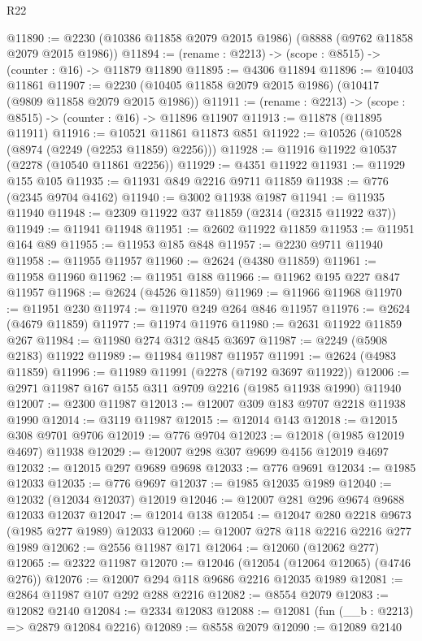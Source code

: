 \begin{lexlean}{R22}
\begin{coremodule}
@11890 := @2230 (@10386 @11858 @2079 @2015 @1986) (@8888 (@9762 @11858 @2079 @2015 @1986))
@11894 := (rename : @2213) -> (scope : @8515) -> (counter : @16) -> @11879 @11890
@11895 := @4306 @11894
@11896 := @10403 @11861
@11907 := @2230 (@10405 @11858 @2079 @2015 @1986) (@10417 (@9809 @11858 @2079 @2015 @1986))
@11911 := (rename : @2213) -> (scope : @8515) -> (counter : @16) -> @11896 @11907
@11913 := @11878 (@11895 @11911)
@11916 := @10521 @11861 @11873 @851
@11922 := @10526 (@10528 (@8974 (@2249 (@2253 @11859) @2256)))
@11928 := @11916 @11922 @10537 (@2278 (@10540 @11861 @2256))
@11929 := @4351 @11922
@11931 := @11929 @155 @105
@11935 := @11931 @849 @2216 @9711 @11859
@11938 := @776 (@2345 @9704 @4162)
@11940 := @3002 @11938 @1987
@11941 := @11935 @11940
@11948 := @2309 @11922 @37 @11859 (@2314 (@2315 @11922 @37))
@11949 := @11941 @11948
@11951 := @2602 @11922 @11859
@11953 := @11951 @164 @89
@11955 := @11953 @185 @848
@11957 := @2230 @9711 @11940
@11958 := @11955 @11957
@11960 := @2624 (@4380 @11859)
@11961 := @11958 @11960
@11962 := @11951 @188
@11966 := @11962 @195 @227 @847 @11957
@11968 := @2624 (@4526 @11859)
@11969 := @11966 @11968
@11970 := @11951 @230
@11974 := @11970 @249 @264 @846 @11957
@11976 := @2624 (@4679 @11859)
@11977 := @11974 @11976
@11980 := @2631 @11922 @11859 @267
@11984 := @11980 @274 @312 @845 @3697
@11987 := @2249 (@5908 @2183) @11922
@11989 := @11984 @11987 @11957
@11991 := @2624 (@4983 @11859)
@11996 := @11989 @11991 (@2278 (@7192 @3697 @11922))
@12006 := @2971 @11987 @167 @155 @311 @9709 @2216 (@1985 @11938 @1990) @11940
@12007 := @2300 @11987
@12013 := @12007 @309 @183 @9707 @2218 @11938 @1990
@12014 := @3119 @11987
@12015 := @12014 @143
@12018 := @12015 @308 @9701 @9706
@12019 := @776 @9704
@12023 := @12018 (@1985 @12019 @4697) @11938
@12029 := @12007 @298 @307 @9699 @4156 @12019 @4697
@12032 := @12015 @297 @9689 @9698
@12033 := @776 @9691
@12034 := @1985 @12033
@12035 := @776 @9697
@12037 := @1985 @12035 @1989
@12040 := @12032 (@12034 @12037) @12019
@12046 := @12007 @281 @296 @9674 @9688 @12033 @12037
@12047 := @12014 @138
@12054 := @12047 @280 @2218 @9673 (@1985 @277 @1989) @12033
@12060 := @12007 @278 @118 @2216 @2216 @277 @1989
@12062 := @2556 @11987 @171
@12064 := @12060 (@12062 @277)
@12065 := @2322 @11987
@12070 := @12046 (@12054 (@12064 @12065) (@4746 @276))
@12076 := @12007 @294 @118 @9686 @2216 @12035 @1989
@12081 := @2864 @11987 @107 @292 @288 @2216
@12082 := @8554 @2079
@12083 := @12082 @2140
@12084 := @2334 @12083
@12088 := @12081 (fun (__b : @2213) => @2879 @12084 @2216)
@12089 := @8558 @2079
@12090 := @12089 @2140

\end{coremodule}
\end{lexlean}
